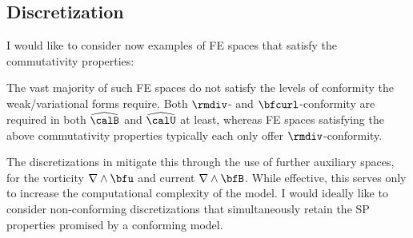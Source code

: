 \subsection*{Discretization}
    \begin{remark}
        I would like to consider now examples of FE spaces that satisfy the commutativity properties:
        \begin{center}\end{center}
        The vast majority of such FE spaces do not satisfy the levels of conformity the weak/variational forms require. Both $\rmdiv$- and $\bfcurl$-conformity are required in both $\widehat{\calB}$ and $\widehat{\calU}$ at least, whereas FE spaces satisfying the above commutativity properties typically each only offer $\rmdiv$-conformity.
        
        The discretizations in \cite{Laakmann_Hu_Farrell_2022} mitigate this through the use of further auxiliary spaces, for the vorticity $\nabla\wedge\bfu$ and current $\nabla\wedge\bfB$. While effective, this serves only to increase the computational complexity of the model. I would ideally like to consider non-conforming discretizations that simultaneously retain the SP properties promised by a conforming model.


\end{remark}
